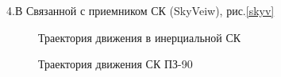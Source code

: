 \documentclass[]{article}
\begin{document}
4.В Связанной с приемником СК (SkyVeiw), рис.\ref{skyv}



\begin{figure}[h!]
	
	\caption{Траектория движения в инерциальной СК  }
	\label{inertz}
\end{figure}

\begin{figure}[h!]
	
	\caption{Траектория движения  СК ПЗ-90 }
	\label{PZ}
\end{figure}
\end{document}
